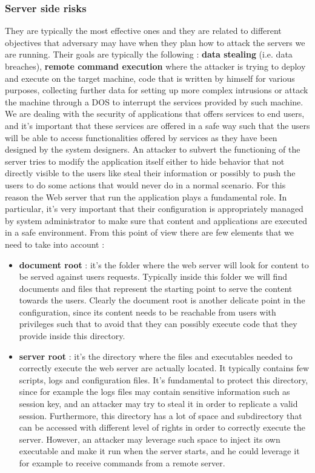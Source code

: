 \subsubsection{Server side risks}
They are typically the most effective ones and they are related to different objectives that adversary may have when they plan how to attack the servers we are running. Their goals are typically the following : \textbf{data stealing} (i.e. data breaches), \textbf{remote command execution} where the attacker is trying to deploy and execute on the target machine, code that is written by himself for various purposes, collecting further data for setting up more complex intrusions or attack the machine through a DOS to interrupt the services provided by such machine. We are dealing with the security of applications that offers services to end users, and it's important that these services are offered in a safe way such that the users will be able to access functionalities offered by services as they have been designed by the system designers. An attacker to subvert the functioning of the server tries to modify the application itself either to hide behavior that not directly visible to the users like steal their information or possibly to push the users to do some actions that would never do in a normal scenario. For this reason the Web server that run the application plays a fundamental role. In particular, it's very important that their configuration is appropriately managed by system administrator to make sure that content and applications are executed in a safe environment. From this point of view there are few elements that we need to take into account :
\begin{itemize}
\item \textbf{document root} : it's the folder where the web server will look for content to be served against users requests. Typically inside this folder we will find documents and files that represent the starting point to serve the content towards the users. Clearly the document root is another delicate point in the configuration, since its content needs to be reachable from users with privileges such that to avoid that they can possibly execute code that they provide inside this directory.
\item \textbf{server root} : it's the directory where the files and executables needed to correctly execute the web server are actually located. It typically contains few scripts, logs and configuration files. It's fundamental to protect this directory, since for example the logs files may contain sensitive information such as session key, and an attacker may try to steal it in order to replicate a valid session. Furthermore, this directory has a lot of space and subdirectory that can be accessed with different level of rights in order to correctly execute the server. However, an attacker may leverage such space to inject its own executable and make it run when the server starts, and he could leverage it for example to receive commands from a remote server. 
\end{itemize}

